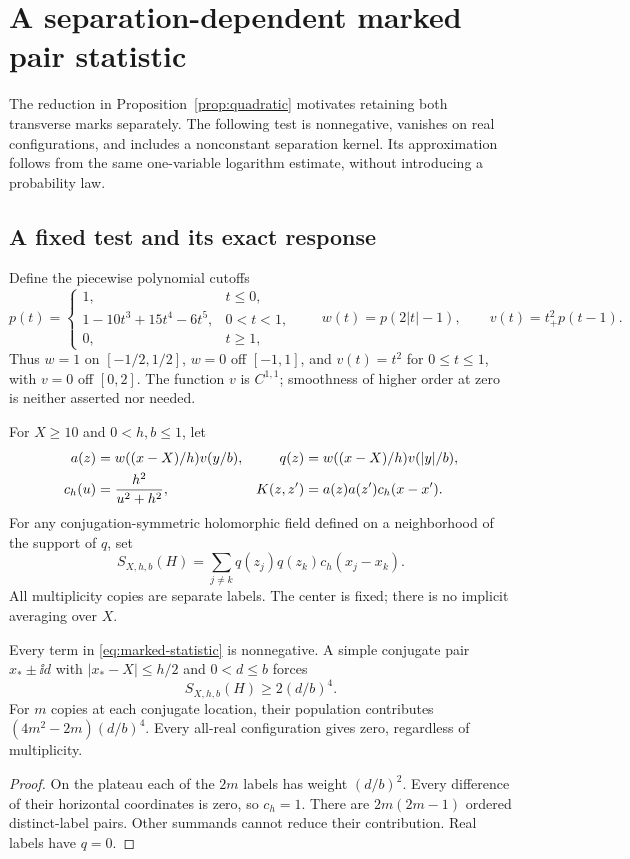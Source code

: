 \section{A separation-dependent marked pair statistic}\label{sec:pairs}

The reduction in Proposition~\ref{prop:quadratic} motivates retaining
both transverse marks separately. The following test is nonnegative,
vanishes on real configurations, and includes a nonconstant separation
kernel. Its approximation follows from the same one-variable logarithm
estimate, without introducing a probability law.

\subsection{A fixed test and its exact response}

Define the piecewise polynomial cutoffs
\begin{equation}\label{eq:p-cutoff}
 p(t)=
 \begin{cases}
 1,&t\le0,\\
 1-10t^3+15t^4-6t^5,&0<t<1,\\
 0,&t\ge1,
 \end{cases}
 \qquad w(t)=p(2|t|-1),\qquad v(t)=t_+^2p(t-1).
\end{equation}
Thus $w=1$ on $[-1/2,1/2]$, $w=0$ off $[-1,1]$,
and $v(t)=t^2$ for $0\le t\le1$, with $v=0$ off $[0,2]$.
The function $v$ is $C^{1,1}$; smoothness of higher order at zero
is neither asserted nor needed.

For $X\ge10$ and $0<h,b\le1$, let
\begin{align}
 a(z)&=w((x-X)/h)v(y/b),&
 q(z)&=w((x-X)/h)v(|y|/b),\label{eq:pair-marks}\\
 c_h(u)&=\frac{h^2}{u^2+h^2},&
 K(z,z')&=a(z)a(z')c_h(x-x').\notag
\end{align}
For any conjugation-symmetric holomorphic field defined on a
neighborhood of the support of $q$, set
\begin{equation}\label{eq:marked-statistic}
 S_{X,h,b}(H)=\sum_{j\ne k}q(z_j)q(z_k)c_h(x_j-x_k).
\end{equation}
All multiplicity copies are separate labels. The center is fixed;
there is no implicit averaging over $X$.

\begin{proposition}\label{prop:pair-signal}
Every term in \eqref{eq:marked-statistic} is nonnegative.
A simple conjugate pair $x_*\pm\ii d$ with
$|x_*-X|\le h/2$ and $0<d\le b$ forces
\begin{equation}\label{eq:marked-signal}
 S_{X,h,b}(H)\ge2(d/b)^4 .
\end{equation}
For $m$ copies at each conjugate location, their population contributes
$(4m^2-2m)(d/b)^4$. Every all-real configuration gives zero,
regardless of multiplicity.
\end{proposition}
\begin{proof}
On the plateau each of the $2m$ labels has weight $(d/b)^2$.
Every difference of their horizontal coordinates is zero, so
$c_h=1$. There are $2m(2m-1)$ ordered distinct-label pairs.
Other summands cannot reduce their contribution. Real labels
have $q=0$.
\end{proof}

